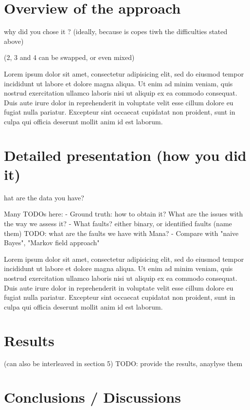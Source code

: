 \documentclass[a4paper, 10pt, conference]{ieeeconf}
\begin{document}
\section{Overview of the approach}
why did you chose it ? (ideally, because is copes tiwh the difficulties stated above)

(2, 3 and 4 can be swapped, or even mixed)



Lorem ipsum dolor sit amet, consectetur adipisicing elit, sed do eiusmod tempor incididunt ut labore et dolore magna aliqua. Ut enim ad minim veniam, quis nostrud exercitation ullamco laboris nisi ut aliquip ex ea commodo consequat. Duis aute irure dolor in reprehenderit in voluptate velit esse cillum dolore eu fugiat nulla pariatur. Excepteur sint occaecat cupidatat non proident, sunt in culpa qui officia deserunt mollit anim id est laborum.

\section{Detailed presentation (how you did it)}
hat are the data you have?

Many TODOs here:
- Ground truth: how to obtain it? What are the issues with the way we assess it?
- What faults? either binary, or identified faults (name them) TODO: what are
the faults we have with Mana?
- Compare with "naive Bayes", "Markov field approach"



Lorem ipsum dolor sit amet, consectetur adipisicing elit, sed do eiusmod tempor incididunt ut labore et dolore magna aliqua. Ut enim ad minim veniam, quis nostrud exercitation ullamco laboris nisi ut aliquip ex ea commodo consequat. Duis aute irure dolor in reprehenderit in voluptate velit esse cillum dolore eu fugiat nulla pariatur. Excepteur sint occaecat cupidatat non proident, sunt in culpa qui officia deserunt mollit anim id est laborum.

\section{Results}

(can also be interleaved in section 5)
TODO: provide the results, anaylyse them

\section{Conclusions / Discussions}
 
\end{document}
